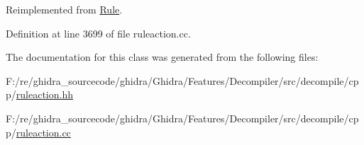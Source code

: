 Reimplemented from \mbox{\hyperlink{class_rule_a4023bfc7825de0ab866790551856d10e}{Rule}}.



Definition at line 3699 of file ruleaction.\+cc.



The documentation for this class was generated from the following files\+:\begin{DoxyCompactItemize}
\item 
F\+:/re/ghidra\+\_\+sourcecode/ghidra/\+Ghidra/\+Features/\+Decompiler/src/decompile/cpp/\mbox{\hyperlink{ruleaction_8hh}{ruleaction.\+hh}}\item 
F\+:/re/ghidra\+\_\+sourcecode/ghidra/\+Ghidra/\+Features/\+Decompiler/src/decompile/cpp/\mbox{\hyperlink{ruleaction_8cc}{ruleaction.\+cc}}\end{DoxyCompactItemize}
